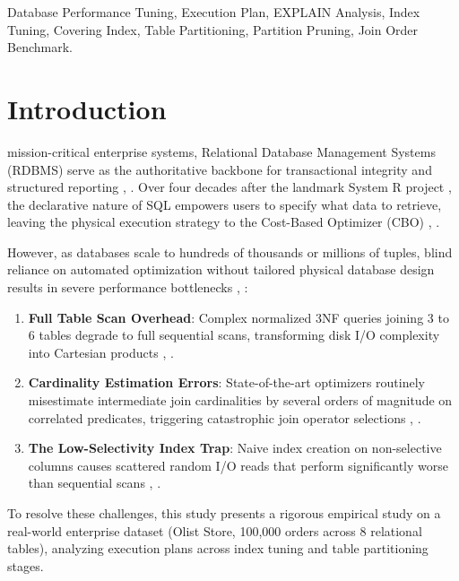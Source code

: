 \documentclass[journal]{IEEEtran}
\begin{document}
\begin{IEEEkeywords}
Database Performance Tuning, Execution Plan, EXPLAIN Analysis, Index Tuning, Covering Index, Table Partitioning, Partition Pruning, Join Order Benchmark.
\end{IEEEkeywords}

\section{Introduction}
 mission-critical enterprise systems, Relational Database Management Systems (RDBMS) serve as the authoritative backbone for transactional integrity and structured reporting \cite{selinger1979access}, \cite{chaudhuri1998overview}. Over four decades after the landmark System R project \cite{selinger1979access}, the declarative nature of SQL empowers users to specify what data to retrieve, leaving the physical execution strategy to the Cost-Based Optimizer (CBO) \cite{graefe1993query}, \cite{ioannidis1996query}.

However, as databases scale to hundreds of thousands or millions of tuples, blind reliance on automated optimization without tailored physical database design results in severe performance bottlenecks \cite{leis2015good}, \cite{leis2018query}:
\begin{enumerate}
    \item \textbf{Full Table Scan Overhead}: Complex normalized 3NF queries joining 3 to 6 tables degrade to full sequential scans, transforming disk I/O complexity into Cartesian products \cite{graefe1993query}, \cite{mishra1992join}.
    \item \textbf{Cardinality Estimation Errors}: State-of-the-art optimizers routinely misestimate intermediate join cardinalities by several orders of magnitude on correlated predicates, triggering catastrophic join operator selections \cite{leis2015good}, \cite{tzoumas2011lightweight}.
    \item \textbf{The Low-Selectivity Index Trap}: Naive index creation on non-selective columns causes scattered random I/O reads that perform significantly worse than sequential scans \cite{chaudhuri1997efficient}, \cite{graefe2011modern}.
\end{enumerate}

To resolve these challenges, this study presents a rigorous empirical study on a real-world enterprise dataset (Olist Store, 100,000 orders across 8 relational tables), analyzing execution plans across index tuning and table partitioning stages.
\end{document}
